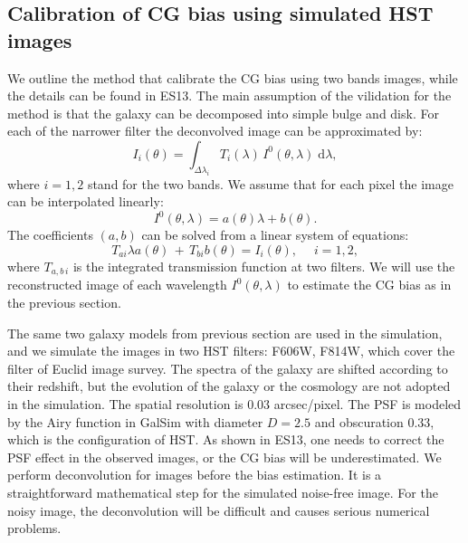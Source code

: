 \documentclass[useAMS,usenatbib]{mn2e}
\renewcommand{\d}{\mathrm{d}}
\newcommand{\be}{\begin{equation}}
\newcommand{\ee}{\end{equation}}
\def\elabel#1{\label{eq:#1}}
\begin{document}
\subsection{Calibration of CG bias using simulated HST images}

We outline the method that calibrate the CG bias using two bands
images, while the details can be found in ES13. The main assumption of
the vilidation for the method is that the galaxy can be decomposed
into simple bulge and disk. For each of the narrower filter the
deconvolved image can be approximated by:
%
\be
I_i(\theta) = \int_{\Delta \lambda_i} T_i(\lambda)\, I^0(\theta,\lambda) \;\d \lambda,
\elabel{linearitp}
\ee
%
where $i=1,2$ stand for the two bands.
We assume that for each pixel the image can be interpolated linearly:
%
\be
I^0(\theta,\lambda)=a(\theta)\lambda + b(\theta).
\ee
%
The coefficients $(a,b)$ can be solved from a linear system of equations:
%
\be
T_{ai} \lambda a(\theta) \,+\,T_{bi} b(\theta) = I_i(\theta), \quad\; i=1,2,
\elabel{lineareq}
\ee
%
where $T_{a,b\,i}$ is the integrated transmission function at two
filters. We will use the reconstructed image of each wavelength
$I^0(\theta,\lambda)$ to estimate the CG bias as in the previous section.

The same two galaxy models from previous section are used in the
simulation, and we simulate the images in two HST filters: F606W,
F814W, which cover the filter of Euclid image survey. The spectra of
the galaxy are shifted according to their redshift, but the evolution
of the galaxy or the cosmology are not adopted in the simulation. The
spatial resolution is $0.03$ arcsec/pixel. The PSF is modeled by the
Airy function in GalSim with diameter $D=2.5$ and obscuration $0.33$,
which is the configuration of HST. As shown in ES13, one needs to
correct the PSF effect in the observed images, or the CG bias will be
underestimated. We perform deconvolution for images before the bias
estimation. It is a straightforward mathematical step for the
simulated noise-free image. For the noisy image, the deconvolution
will be difficult and causes serious numerical problems.
\end{document}
